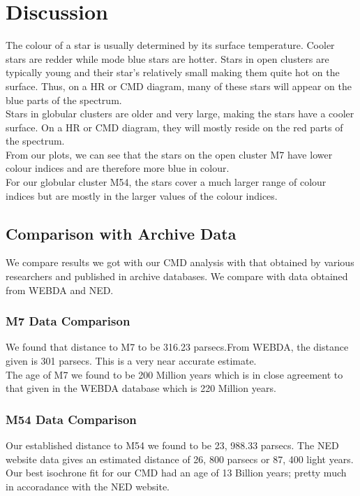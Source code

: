 \documentclass[12pt, twocolumn]{aastex62}
\begin{document}
	\section{Discussion}
	The colour of a star is usually determined by its surface temperature. Cooler stars are redder while mode blue stars are hotter. Stars in open clusters are typically young and their star's relatively small making them quite hot on the surface. Thus, on a HR or CMD diagram, many of these stars will appear on the blue parts of the spectrum.\\
	Stars in globular clusters are older and very large, making the stars have a cooler surface. On a HR or CMD diagram, they will mostly reside on the red parts of the spectrum.\\
	From our plots, we can see that the stars on the open cluster M7 have lower colour indices and are therefore more blue in colour.\\
	For our globular cluster M54, the stars cover a much larger range of colour indices but are mostly in the larger values of the colour indices.\\
		\subsection{Comparison with Archive Data}
		We compare results we got with our CMD analysis with that obtained by various researchers and published in archive databases. We compare with data obtained from WEBDA and NED.
			\subsubsection{M7 Data Comparison}
			We found that distance to M7 to be 316.23 parsecs.From WEBDA, the distance given is 301 parsecs. This is a very near accurate estimate.\\
			The age of M7 we found to be 200 Million years which is in close agreement to that given in the WEBDA database which is 220 Million years.
			\subsubsection{M54 Data Comparison}
			Our established distance to M54 we found to be 23, 988.33 parsecs. The NED website data gives an estimated distance of 26, 800 parsecs or 87, 400 light years.\\
			Our best isochrone fit for our CMD had an age of 13 Billion years; pretty much in accoradance with the NED website.
\end{document}
